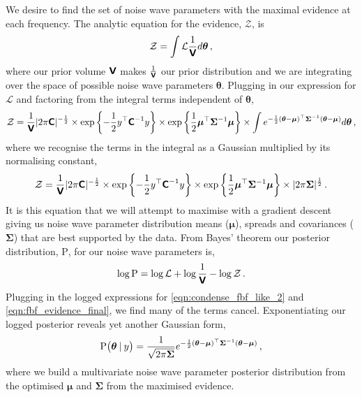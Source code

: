 We desire to find the set of noise wave parameters with the maximal evidence at each frequency. The analytic equation for the evidence, $\mathcal{Z}$, is
\begin{equation}
    \mathcal{Z} = \int \mathcal{L} \frac{1}{\textbf{\textsf{V}}} d\boldsymbol{\theta} \,,
    \label{eqn:fbf_evidence}
\end{equation}
where our prior volume $\textbf{\textsf{V}}$ makes $\frac{1}{\textbf{\textsf{V}}}$ our prior distribution and we are integrating over the space of possible noise wave parameters $\boldsymbol{\theta}$. Plugging in our expression for $\mathcal{L}$ and factoring from the integral terms independent of $\boldsymbol{\theta}$,
\begin{equation}
    \mathcal{Z} = \frac{1}{\textbf{\textsf{V}}} |2 \pi \textbf{\textsf{C}}|^{-\frac{1}{2}} \times \exp \left\{ -\frac{1}{2} y^{\top} \textbf{\textsf{C}}^{-1} y \right\} \times \exp \left\{ \frac{1}{2} \boldsymbol{\mu}^{\top} \bm{\Sigma}^{-1} \boldsymbol{\mu} \right\} \times \int e^{-\frac{1}{2} \left( \boldsymbol{\theta} - \boldsymbol{\mu} \right)^{\top} \bm{\Sigma}^{-1} \left( \boldsymbol{\theta} - \boldsymbol{\mu} \right)} d\boldsymbol{\theta} \,,
    \label{eqn:fbf_evidence_gauss}
\end{equation}
where we recognise the terms in the integral as a Gaussian multiplied by its normalising constant,
\begin{equation}
    \mathcal{Z} = \frac{1}{\textbf{\textsf{V}}} |2 \pi \textbf{\textsf{C}}|^{-\frac{1}{2}} \times \exp \left\{ -\frac{1}{2} y^{\top} \textbf{\textsf{C}}^{-1} y \right\} \times \exp \left\{ \frac{1}{2} \boldsymbol{\mu}^{\top} \bm{\Sigma}^{-1} \boldsymbol{\mu} \right\} \times |2 \pi \bm{\Sigma}|^{\frac{1}{2}} \,.
    \label{eqn:fbf_evidence_final}
\end{equation}
It is this equation that we will attempt to maximise with a gradient descent giving us noise wave parameter distribution means ($\boldsymbol{\mu}$), spreads and covariances ($\bm{\Sigma}$) that are best supported by the data. From Bayes' theorem our posterior distribution, $\mathrm{P}$, for our noise wave parameters is,
\begin{equation}
    \log \mathrm{P} = \log \mathcal{L} + \log \frac{1}{\textbf{\textsf{V}}} - \log \mathcal{Z} \,.
\end{equation}
Plugging in the logged expressions for \cref{eqn:condense_fbf_like_2} and \cref{eqn:fbf_evidence_final}, we find many of the terms cancel. Exponentiating our logged posterior reveals yet another Gaussian form,
\begin{equation}
    \mathrm{P} \big( \boldsymbol{\theta} \:\vert\: y \big)= \frac{1}{\sqrt{2 \pi \bm{\Sigma}}} e^{-\frac{1}{2} \left( \boldsymbol{\theta} - \boldsymbol{\mu} \right)^{\top} \bm{\Sigma}^{-1} \left( \boldsymbol{\theta} - \boldsymbol{\mu} \right)} \,,
    \label{eqn:fbf_posterior}
\end{equation}
where we build a multivariate noise wave parameter posterior distribution from the optimised $\boldsymbol{\mu}$ and $\bm{\Sigma}$ from the maximised evidence.


